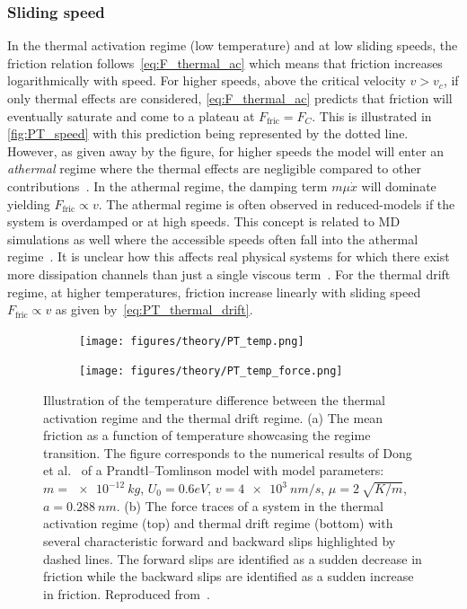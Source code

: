 \subsubsection{Sliding speed}
In the thermal activation regime (low temperature) and at low sliding speeds, the
friction relation follows~\cref{eq:F_thermal_ac} which means that friction
increases logarithmically with speed. For higher speeds, above the critical
velocity $v > v_c$, if only thermal effects are considered,
\cref{eq:F_thermal_ac} predicts that friction will eventually saturate and come
to a plateau at $F_{\text{fric}} = F_C$. This is illustrated in
\cref{fig:PT_speed} with this prediction being represented by the dotted line.
However, as given away by the figure, for higher speeds the model will enter an
\textit{athermal} regime where the thermal effects are negligible compared to
other contributions~\cite{PhysRevLett.89.224301}. In the athermal regime, the
damping term $m\mu \dot{x}$ will dominate yielding $F_{\text{fric}}\propto v$.
The athermal regime is often observed in reduced-models if the system is
overdamped or at high speeds. This concept is related to \acrshort{MD}
simulations as well where the accessible speeds often fall into the athermal
regime~\cite{Li_2011}. It is unclear how this affects real physical systems for
which there exist more dissipation channels than just a single viscous
term~\cite{Dong_2013}. For the thermal drift regime, at higher temperatures, friction increase linearly with sliding speed $F_{\text{fric}} \propto v$ as given by~\cref{eq:PT_thermal_drift}.


\begin{figure}[!htb]
  \centering
  \begin{subfigure}[t]{0.49\textwidth}
      \centering
      \texttt{[image: figures/theory/PT\_temp.png]}
      \caption{}
      \label{fig:PT_temp_a}
  \end{subfigure}
  \hfill
  \begin{subfigure}[t]{0.49\textwidth}
      \centering
      \texttt{[image: figures/theory/PT\_temp\_force.png]}
      \caption{}
      \label{fig:PT_temp_b}
  \end{subfigure}
  \hfill
  \hfill
     \caption{Illustration of the temperature difference between the thermal activation regime and the thermal drift regime. (a) The mean friction as a function of temperature showcasing the regime transition. The figure corresponds to the numerical results of Dong et al.~\cite{Yalin_2011} of a Prandtl–Tomlinson model with model parameters: $m=\SI{e-12}{kg}$, $U_0={0.6}{eV}$, $v=\SI{4e3}{nm/s}$, $\mu=\SI{2}{\sqrt{K/m}}$, $a=\SI{0.288}{nm}$. (b) The force traces of a system in the thermal activation regime (top) and thermal drift regime (bottom) with several characteristic forward and backward slips highlighted by dashed lines. The forward slips are identified as a sudden decrease in friction while the backward slips are identified as a sudden increase in friction. Reproduced from~\cite{Yalin_2011}.}
     \label{fig:PT_temp}
\end{figure}



